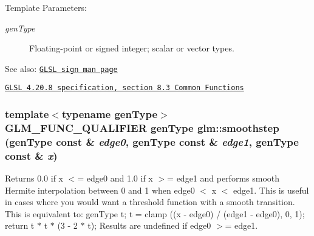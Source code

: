 \begin{Desc}
\item[Template Parameters:]
\begin{description}
\item[{\em genType}]Floating-point or signed integer; scalar or vector types.\end{description}
\end{Desc}
\begin{Desc}
\item[See also:]\href{http://www.opengl.org/sdk/docs/manglsl/xhtml/sign.xml}{\tt GLSL sign man page} 

\href{http://www.opengl.org/registry/doc/GLSLangSpec.4.20.8.pdf}{\tt GLSL 4.20.8 specification, section 8.3 Common Functions} \end{Desc}
\hypertarget{group__core__func__common_gcd449790122dcacf69b7e8a53f97fdd8}{
\subsubsection[smoothstep]{\setlength{\rightskip}{0pt plus 5cm}template$<$typename genType$>$ GLM\_\-FUNC\_\-QUALIFIER genType glm::smoothstep (genType const \& {\em edge0}, \/  genType const \& {\em edge1}, \/  genType const \& {\em x})}}
\label{group__core__func__common_gcd449790122dcacf69b7e8a53f97fdd8}


Returns 0.0 if x $<$= edge0 and 1.0 if x $>$= edge1 and performs smooth Hermite interpolation between 0 and 1 when edge0 $<$ x $<$ edge1. This is useful in cases where you would want a threshold function with a smooth transition. This is equivalent to: genType t; t = clamp ((x - edge0) / (edge1 - edge0), 0, 1); return t $\ast$ t $\ast$ (3 - 2 $\ast$ t); Results are undefined if edge0 $>$= edge1.

